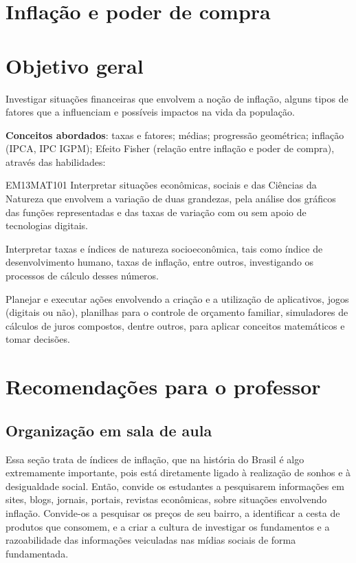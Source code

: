 \begin{paginatexto}
\section*{Inflação e poder de compra}
\section*{Objetivo geral}
Investigar situações financeiras que envolvem a noção de inflação, alguns tipos de fatores que a influenciam e possíveis impactos na vida da população.

\textbf{Conceitos abordados}: taxas e fatores; médias; progressão geométrica; inflação (IPCA, IPC IGPM); Efeito Fisher (relação entre inflação e poder de compra), através das habilidades:

\begin{habilities}{EM13MAT101}
 Interpretar situações econômicas, sociais e das Ciências da Natureza
que envolvem a variação de duas grandezas, pela análise dos gráficos das funções representadas e das taxas de variação com ou sem apoio de tecnologias digitais.


Interpretar taxas e índices de natureza socioeconômica, tais como índice de desenvolvimento humano, taxas de inflação, entre outros, investigando os processos de cálculo desses números.

Planejar e executar ações envolvendo a criação e a utilização de aplicativos, jogos (digitais ou não), planilhas para o controle de orçamento familiar, simuladores de cálculos de juros compostos, dentre outros, para aplicar conceitos matemáticos e tomar decisões. 

\end{habilities}

\section*{Recomendações para o professor}

\subsection{Organização em sala de aula} Essa seção trata de índices de inflação, que na história do Brasil é algo extremamente importante, pois está diretamente ligado à realização de sonhos e à desigualdade social. Então, convide os estudantes a pesquisarem informações em sites, blogs, jornais, portais, revistas econômicas, sobre situações envolvendo inflação. Convide-os a pesquisar os preços de seu bairro, a identificar a cesta de produtos que consomem, e a criar a cultura de investigar os fundamentos e a razoabilidade das informações veiculadas nas mídias sociais de forma fundamentada.


\end{paginatexto}
